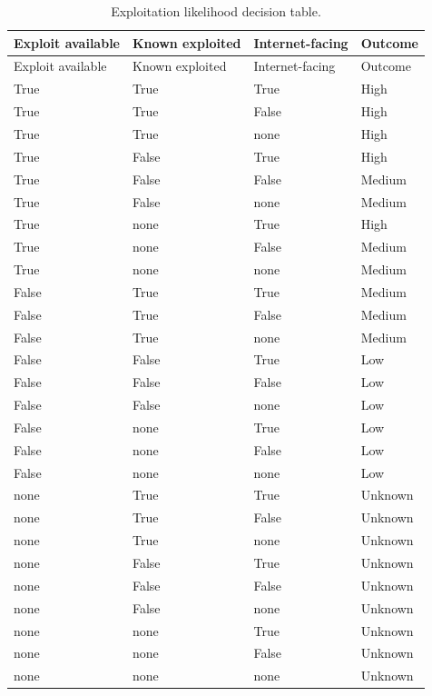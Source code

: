 \begin{longtable}{@{}llll@{}}
\caption{Exploitation likelihood decision table.}\label{tab:dt-likelihood}\\
\toprule
Exploit available & Known exploited & Internet-facing & Outcome \\ \midrule
\endfirsthead
\toprule Exploit available & Known exploited & Internet-facing & Outcome \\ \midrule
\endhead
\bottomrule
\endfoot
True & True & True & High \\
True & True & False & High \\
True & True & none & High \\
True & False & True & High \\
True & False & False & Medium \\
True & False & none & Medium \\
True & none & True & High \\
True & none & False & Medium \\
True & none & none & Medium \\
False & True & True & Medium \\
False & True & False & Medium \\
False & True & none & Medium \\
False & False & True & Low \\
False & False & False & Low \\
False & False & none & Low \\
False & none & True & Low \\
False & none & False & Low \\
False & none & none & Low \\
none & True & True & Unknown \\
none & True & False & Unknown \\
none & True & none & Unknown \\
none & False & True & Unknown \\
none & False & False & Unknown \\
none & False & none & Unknown \\
none & none & True & Unknown \\
none & none & False & Unknown \\
none & none & none & Unknown \\
\end{longtable}

